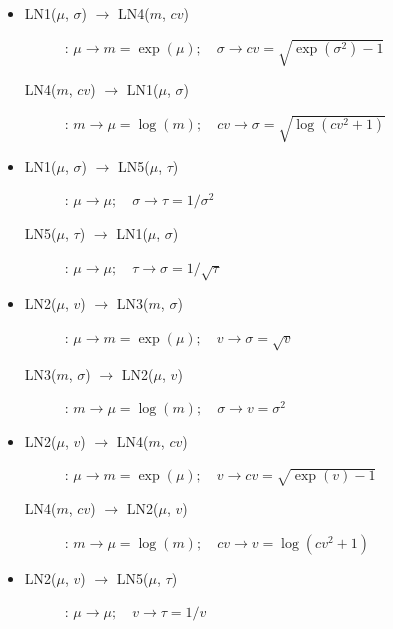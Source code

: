 {\begin{itemize}
\begin{description}
\item[LN3($m$, $\sigma$) $\rightarrow$ LN1($\mu$, $\sigma$)]:
$m \rightarrow \mu=\log(m); \quad \sigma \rightarrow \sigma$
\end{description}

\item 
\begin{description}
\item[LN1($\mu$, $\sigma$) $\rightarrow$ LN4($m$, $cv$)]:
$\mu \rightarrow m=\exp(\mu); \quad \sigma \rightarrow cv=\sqrt{\exp(\sigma^2)-1}$

\item[LN4($m$, $cv$) $\rightarrow$ LN1($\mu$, $\sigma$)]:
$m \rightarrow \mu=\log(m); \quad cv \rightarrow \sigma=\sqrt{\log(cv^2 + 1)}$
\end{description}

\item 
\begin{description}
\item[LN1($\mu$, $\sigma$) $\rightarrow$ LN5($\mu$, $\tau$)]:
$\mu \rightarrow \mu; \quad \sigma \rightarrow \tau=1/\sigma^2$

\item[LN5($\mu$, $\tau$) $\rightarrow$ LN1($\mu$, $\sigma$)]:
$\mu \rightarrow \mu; \quad \tau \rightarrow \sigma=1/\sqrt{\tau}$
\end{description}

\item 
\begin{description}
\item[LN2($\mu$, $v$) $\rightarrow$ LN3($m$, $\sigma$)]:
$\mu \rightarrow m=\exp(\mu); \quad v \rightarrow \sigma=\sqrt{v}$

\item[LN3($m$, $\sigma$) $\rightarrow$ LN2($\mu$, $v$)]:
$m \rightarrow \mu=\log(m); \quad \sigma \rightarrow v=\sigma^2$
\end{description}


\item 
\begin{description}
\item[LN2($\mu$, $v$) $\rightarrow$ LN4($m$, $cv$)]:
$\mu \rightarrow m=\exp(\mu); \quad v \rightarrow cv=\sqrt{\exp(v) -1}$

\item[LN4($m$, $cv$) $\rightarrow$ LN2($\mu$, $v$)]:
$m \rightarrow \mu=\log(m); \quad cv \rightarrow v=\log(cv^2+1)$
\end{description}

\item 
\begin{description}
\item[LN2($\mu$, $v$) $\rightarrow$ LN5($\mu$, $\tau$)]:
$\mu \rightarrow \mu; \quad v \rightarrow \tau=1/v$


\end{description}
\end{itemize}}
